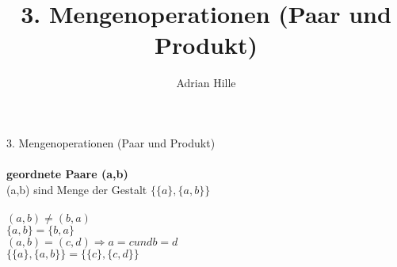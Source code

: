 \documentclass{scrartcl}\usepackage[utf8]{inputenc}
\title{3. Mengenoperationen (Paar und Produkt)}
\author{Adrian Hille}
\begin{document}
\Large 3. Mengenoperationen (Paar und Produkt)\\
\\
\normalsize
\textbf{geordnete Paare (a,b)}\\
(a,b) sind Menge der Gestalt $\{\{a\},\{a,b\}\}$\\
\\
$(a,b) \neq (b,a)$\\
$\{a,b\}=\{b,a\}$\\
$(a,b) = (c,d) \Rightarrow a=c und b=d$\\
$\{\{a\},\{a,b\}\}=\{\{c\},\{c,d\}\}$\\
\end{document}
